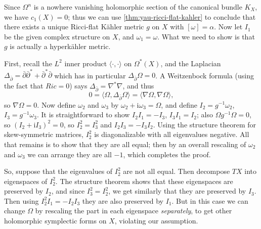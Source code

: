 \documentclass[12pt,letterpaper,reqno]{article}
\numberwithin{equation}{section}
\newcommand{\kahler}{K\"ahler\xspace}
\newcommand{\hk}{hyperk\"ahler\xspace}
\newcommand{\I}{{\mathrm i}}
\newcommand{\IP}[1]{\langle#1\rangle}
\newcommand{\ti}[1]{\textit{#1}}
\newcommand{\fixme}[1]{{\color{blue}{[#1]}}}
\begin{document}
\begin{pf} Since $\Omega^n$ is a nowhere vanishing 
holomorphic section of the canonical bundle $K_X$, 
we have $c_1(X) = 0$; thus we can use
\autoref{thm:yau-ricci-flat-kahler}
to conclude that there exists a unique Ricci-flat \kahler
metric $g$ on $X$ with $[\omega] = \alpha$.
Now let $I_1$ be the given complex structure on $X$,
and $\omega_1 = \omega$.
What we need to show is 
that $g$ is actually a \hk metric.

First, recall the $L^2$ inner product $\IP{\cdot,\cdot}$ on $\Omega^*(X)$, and
the Laplacian $\Delta_{\bar \partial} = \bar\partial \bar\partial^* + \bar\partial^* \bar\partial$
which has in particular $\Delta_{\bar \partial} \Omega = 0$.
A Weitzenbock formula (using the fact that $Ric = 0$)
says $\Delta_{\bar\partial} = \nabla^* \nabla$, \fixme{give ref}
and thus
\begin{equation}
  0 = \IP{\Omega, \Delta_{\bar \partial} \Omega} = \IP{\nabla\Omega,\nabla\Omega},
\end{equation}
so $\nabla \Omega = 0$. 
Now define $\omega_2$ and $\omega_3$ by
$\omega_2 + \I \omega_3 = \Omega$, and define
$I_2 = g^{-1} \omega_2$, $I_3 = g^{-1} \omega_3$.
It is straightforward to show $I_2 I_1 = -I_3$, $I_3 I_1 = I_2$;
also $\Omega g^{-1} \Omega = 0$, so
$(I_2 + \I I_3)^2 = 0$, so $I_2^2 = I_3^2$ and
$I_2 I_3 = -I_3 I_2$.
Using the structure theorem 
for skew-symmetric matrices, $I_2^2$ is
diagonalizable with all eigenvalues negative.
All that remains is to show that they are all equal;
then by an overall rescaling of $\omega_2$
and $\omega_3$ we can arrange they are all $-1$,
which completes the proof.

So, suppose that the eigenvalues of
$I_2^2$ are not all equal.
Then decompose $TX$ into eigenspaces of $I_2^2$.
The structure theorem shows that these eigenspaces are
preserved by $I_2$, and since $I_3^2 = I_2^2$,
we get similarly that they are preserved by $I_3$.
Then using $I_2^2 I_1 = -I_2 I_3$ they are also 
preserved by $I_1$. But in this case we can change $\Omega$
by rescaling the part in each eigenspace \ti{separately},
to get other holomorphic symplectic forms on $X$,
violating our assumption.
\end{pf}

\begin{example}[K3 surface] \fixme{...}
\fixme{SYZ fibration} \fixme{Gross-Wilson picture}
\end{example}
\end{document}
